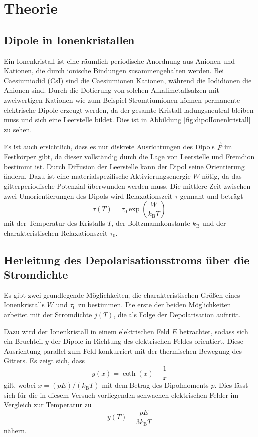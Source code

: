 \section{Theorie}
\label{sec:Theorie}

\subsection{Dipole in Ionenkristallen}
Ein Ionenkristall ist eine räumlich periodische Anordnung aus Anionen und Kationen, die durch ionische Bindungen zusammengehalten werden. Bei Caesiumiodid (CsI) sind die Caesiumionen  Kationen, während die Iodidionen  die Anionen sind.
Durch die Dotierung von solchen Alkalimetallsalzen mit zweiwertigen Kationen wie zum Beispiel Stromtiumionen  können permanente elektrische Dipole erzeugt werden, da der gesamte Kristall ladungsneutral bleiben muss und sich eine Leerstelle bildet. Dies ist in Abbildung \ref{fig:dipolIonenkristall} zu sehen.

Es ist auch ersichtlich, dass es nur diskrete Ausrichtungen des Dipols $\vec{P}$ im Festkörper gibt, da dieser vollständig durch die Lage von Leerstelle und Fremdion bestimmt ist. Durch Diffusion der Leerstelle kann der Dipol seine Orientierung ändern. Dazu ist eine materialspezifische Aktivierungsenergie $W$ nötig, da das gitterperiodische Potenzial überwunden werden muss. Die mittlere Zeit zwischen zwei Umorientierungen des Dipols wird Relaxationszeit $\tau$ gennant und beträgt
\begin{equation}
  \tau(T) = \tau_0 \exp\left(\frac{W}{k_{\text{B}}T}\right)
  \label{eqn:relaxtime}
\end{equation}
mit der Temperatur des Kristalls $T$, der Boltzmannkonstante $k_{\text{B}}$ und der charakteristischen Relaxationszeit $\tau_0$.

\subsection{Herleitung des Depolarisationsstroms über die Stromdichte}
Es gibt zwei grundlegende Möglichkeiten, die charakteristischen Größen eines Ionenkristalls $W$ und $\tau_0$ zu bestimmen. Die erste der beiden Möglichkeiten arbeitet mit der Stromdichte $j(T)$, die als Folge der Depolarisation auftritt.

Dazu wird der Ionenkristall in einem elektrischen Feld $E$ betrachtet, sodass sich ein Bruchteil $y$ der Dipole in Richtung des elektrischen Feldes orientiert. Diese Ausrichtung parallel zum Feld konkurriert mit der thermischen Bewegung des Gitters. Es zeigt sich, dass
\begin{equation}
  y(x) = \coth(x) - \frac{1}{x}
  \label{eqn:langevin}
\end{equation}
gilt, wobei $x=(pE)/(k_\text{B}T)$ mit dem Betrag des Dipolmoments $p$.
Dies lässt sich für die in diesem Versuch vorliegenden schwachen elektrischen Felder im Vergleich zur Temperatur zu
\begin{equation}
  y(T) = \frac{pE}{3k_\text{B}T}
  \label{eqn:yApprox}
\end{equation}
nähern.

